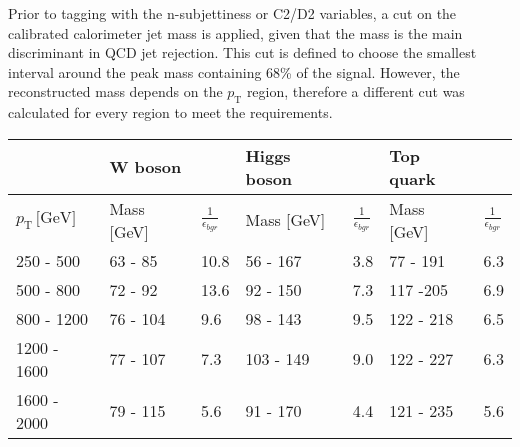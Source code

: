 Prior to tagging with the n-subjettiness or C2/D2 variables, a cut on the calibrated calorimeter jet mass is applied, given that the mass is the main discriminant in QCD jet rejection. This cut is defined to choose the smallest interval around the peak mass containing 68\% of the signal. However, the reconstructed mass depends on the $p_{\mathrm{T}}$ region, therefore a different cut was calculated for every region to meet the requirements.
\begin{table}[]
\centering
\begin{tabular}{l||ll||ll||ll}
  &  \textbf{W boson}                                                    &                                 &  \textbf{Higgs boson}                                  &                                &    \textbf{Top quark}                                  &                                  \\ \hline
$p_{\mathrm{T}} \, \text{[GeV]}$   & \multicolumn{1}{l|}{Mass [GeV]} & $\frac{1}{\epsilon_{bgr}}$ & \multicolumn{1}{l|}{Mass [GeV]} & $\frac{1}{\epsilon_{bgr}}$ & \multicolumn{1}{l|}{Mass [GeV]}  & $\frac{1}{\epsilon_{bgr}}$ \\ \hline \hline
250 - 500 & \multicolumn{1}{l|}{63 - 85}                        & 10.8                            & \multicolumn{1}{l|}{56 - 167}          & 3.8                             & \multicolumn{1}{l|}{77 - 191}          & 6.3                             \\ \cline{1-7} 
500 - 800 & \multicolumn{1}{l|}{72 - 92}                        & 13.6                            & \multicolumn{1}{l|}{92 - 150}          & 7.3                             & \multicolumn{1}{l|}{117 -205}          & 6.9                             \\ \cline{1-7} 
800 - 1200 & \multicolumn{1}{l|}{76 - 104}                       & 9.6                             & \multicolumn{1}{l|}{98 - 143}          & 9.5                             & \multicolumn{1}{l|}{122 - 218}         & 6.5                             \\ \cline{1-7} 
1200 - 1600 & \multicolumn{1}{l|}{77 - 107}                       & 7.3                             & \multicolumn{1}{l|}{103 - 149}         & 9.0                             & \multicolumn{1}{l|}{122 - 227}         & 6.3                             \\ \cline{1-7} 
1600 - 2000 & \multicolumn{1}{l|}{79 - 115}                       & 5.6                             & \multicolumn{1}{l|}{91 - 170}          & 4.4                             & \multicolumn{1}{l|}{121 - 235}         & 5.6                             \\ \cline{1-7} 

\end{tabular}
\end{table}
